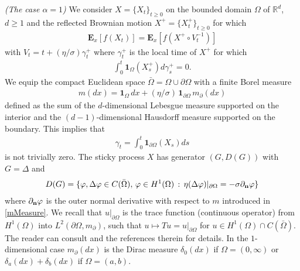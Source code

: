 \documentclass[10pt,a4paper]{article}
\numberwithin{equation}{section}
\theoremstyle{plain}
\theoremstyle{remark}
\begin{document}
{\it (The case $\alpha=1$)} We consider $X=\{X_t\}_{t\geq 0}$ on the bounded domain $\Omega$ of $\mathbb{R}^d$, $d\geq 1$ and the reflected Brownian motion $X^+=\{X^+_t\}_{t \geq 0}$ for which
\begin{align*}
\mathbf{E}_x[f(X_t)] = \mathbf{E}_x[f(X^+ \circ V^{-1}_t)]
\end{align*}
with $V_t = t + (\eta/\sigma) \gamma^+_t$ where $\gamma^+_t$ is the local time of $X^+$ for which
\begin{align*}
\int_0^t \mathbf{1}_{\Omega}(X^+_s) d\gamma^+_s = 0.
\end{align*}
We equip the compact Euclidean space $\bar{\Omega} = \Omega \cup \partial \Omega$ with a finite Borel measure
\begin{align}
m(dx) = \mathbf{1}_\Omega\, dx + (\eta/\sigma)\, \mathbf{1}_{\partial \Omega} \, m_\partial(dx)
\label{mMeasure}
\end{align}
defined as the sum of the $d$-dimensional Lebesgue measure supported on the interior and the $(d-1)$-dimensional Hausdorff measure supported on the boundary. This implies that 
\begin{align*}
\gamma_t = \int_0^t \mathbf{1}_{\partial \Omega}(X_s)ds
\end{align*}
is not trivially zero. The sticky process $X$ has generator $(G, D(G))$ with $G=\Delta$ and
\begin{align*}
D(G) = \{\varphi, \Delta \varphi \in C(\bar{\Omega}), \, \varphi \in H^1(\Omega)\,:\, \eta (\Delta \varphi) |_{\partial \Omega} = - \sigma \partial_{\bf n} \varphi \}
\end{align*}
where $\partial_{\bf n}\varphi$ is the outer normal derivative with respect to $m$ introduced in \eqref{mMeasure}. We recall that $u|_{\partial \Omega}$ is the trace function (continuous operator) from $H^1(\Omega)$ into $L^2(\partial \Omega, m_\partial)$, such that $u \mapsto Tu=u|_{\partial \Omega}$ for $u \in H^1(\Omega)\cap C(\bar{\Omega})$. The reader can consult \cite{EJP} and the references therein for details. In the $1$-dimensional case $m_\partial(dx)$ is the Dirac measure $\delta_0(dx)$ if $\Omega=(0, \infty)$ or $\delta_a(dx) + \delta_b(dx)$ if $\Omega=(a,b)$. 
\end{document}
